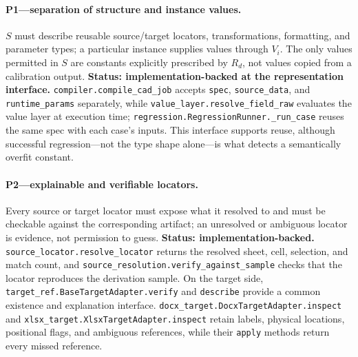 \paragraph{P1---separation of structure and instance values.}
$S$ must describe reusable source/target locators, transformations, formatting, and
parameter types; a particular instance supplies values through $V_i$. The only values
permitted in $S$ are constants explicitly prescribed by $R_d$, not values copied from a
calibration output. \textbf{Status: implementation-backed at the representation
interface.} \texttt{compiler.compile\_cad\_job} accepts \texttt{spec},
\texttt{source\_data}, and \texttt{runtime\_params} separately, while
\texttt{value\_layer.resolve\_field\_raw} evaluates the value layer at execution time;
\texttt{regression.RegressionRunner.\_run\_case} reuses the same spec with each case's
inputs.
This interface supports reuse, although successful regression---not the type shape
alone---is what detects a semantically overfit constant.

\paragraph{P2---explainable and verifiable locators.}
Every source or target locator must expose what it resolved to and must be checkable
against the corresponding artifact; an unresolved or ambiguous locator is evidence, not
permission to guess. \textbf{Status: implementation-backed.}
\texttt{source\_locator.resolve\_locator} returns the resolved sheet, cell, selection,
and match count, and \texttt{source\_resolution.verify\_against\_sample} checks that the
locator reproduces the derivation sample. On the target side,
\texttt{target\_ref.BaseTargetAdapter.verify} and \texttt{describe} provide a common
existence and explanation interface.
\texttt{docx\_target.DocxTargetAdapter.inspect} and
\texttt{xlsx\_target.XlsxTargetAdapter.inspect} retain labels, physical locations,
positional flags, and ambiguous references, while their \texttt{apply} methods return
every missed reference.

